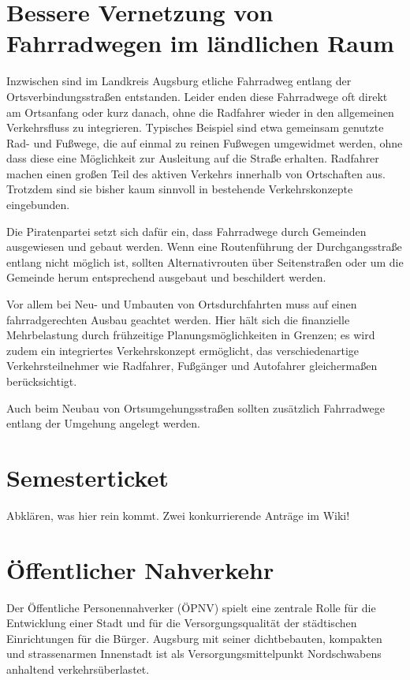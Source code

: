   \section{Bessere Vernetzung von Fahrradwegen im ländlichen Raum}
  
  Inzwischen sind im Landkreis Augsburg etliche Fahrradweg entlang der 
  Ortsverbindungsstraßen entstanden. Leider enden diese Fahrradwege oft direkt 
  am Ortsanfang oder kurz danach, ohne die Radfahrer wieder in den allgemeinen 
  Verkehrsfluss zu integrieren. Typisches Beispiel sind etwa gemeinsam 
  genutzte Rad- und Fußwege, die auf einmal zu reinen Fußwegen umgewidmet 
  werden, ohne dass diese eine Möglichkeit zur Ausleitung auf die Straße 
  erhalten. Radfahrer machen einen großen Teil des aktiven Verkehrs innerhalb 
  von Ortschaften aus. Trotzdem sind sie bisher kaum sinnvoll in bestehende 
  Verkehrskonzepte eingebunden.
  
  Die Piratenpartei setzt sich dafür ein, dass Fahrradwege durch Gemeinden 
  ausgewiesen und gebaut werden. Wenn eine Routenführung der Durchgangsstraße 
  entlang nicht möglich ist, sollten Alternativrouten über Seitenstraßen oder 
  um die Gemeinde herum entsprechend ausgebaut und beschildert werden.
  
  Vor allem bei Neu- und Umbauten von Ortsdurchfahrten muss auf einen 
  fahrradgerechten Ausbau geachtet werden. Hier hält sich die finanzielle 
  Mehrbelastung durch frühzeitige Planungsmöglichkeiten in Grenzen; es wird 
  zudem ein integriertes Verkehrskonzept ermöglicht, das verschiedenartige 
  Verkehrsteilnehmer wie Radfahrer, Fußgänger und Autofahrer gleichermaßen 
  berücksichtigt.
  
  Auch beim Neubau von Ortsumgehungsstraßen sollten zusätzlich Fahrradwege 
  entlang der Umgehung angelegt werden.
  
  \section{Semesterticket}
  
  Abklären, was hier rein kommt. Zwei konkurrierende Anträge im Wiki!
  
  \section{Öffentlicher Nahverkehr}
  
  Der Öffentliche Personennahverker (ÖPNV) spielt eine zentrale Rolle für die 
  Entwicklung einer Stadt und für die Versorgungsqualität der städtischen 
  Einrichtungen für die Bürger. Augsburg mit seiner dichtbebauten, kompakten 
  und strassenarmen Innenstadt ist als Versorgungsmittelpunkt Nordschwabens 
  anhaltend verkehrsüberlastet.
  
